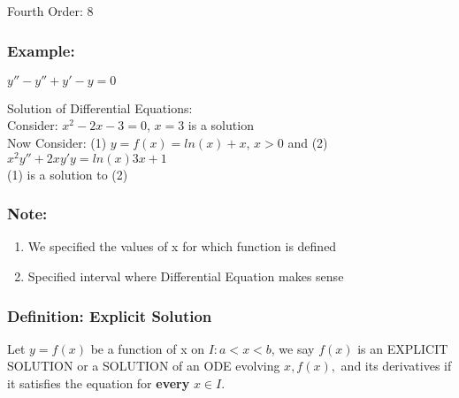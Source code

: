 \documentclass{article}
\theoremstyle{definition}
\theoremstyle{remark}
\begin{document}
Fourth Order: $8$

\vspace{6pt}

\subsubsection{Example:}

$y'' - y'' + y' - y = 0$

Solution of Differential Equations:\\

Consider: $x^2 - 2x - 3 = 0$, $x = 3$ is a solution\\

Now Consider: (1) $y=f(x)=ln(x)+x$, $x > 0$ and (2) $x^2y'' + 2xy' y = ln(x) 3x + 1$\\

(1) is a solution to (2)\\

\subsubsection{Note:}
\begin{enumerate}
\item We specified the values of x for which function is defined
\item Specified interval where Differential Equation makes sense
\end{enumerate}


\subsubsection{Definition: Explicit Solution}
Let $y=f(x)$ be a function of x on $I: a<x<b$, we say $f(x)$ is an EXPLICIT SOLUTION or a SOLUTION of an ODE evolving $x, f(x),$ and its derivatives if it satisfies the equation for \textbf{every} $x \in I$.
\end{document}
